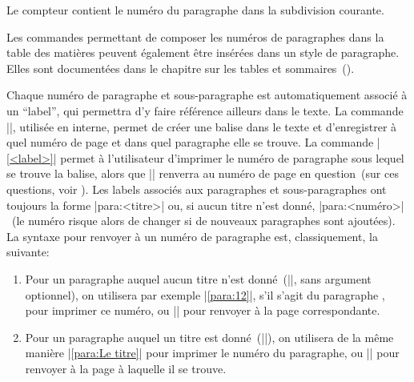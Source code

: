 \begin{developer}
Le compteur  contient le numéro du paragraphe dans la subdivision courante.
\end{developer}

\begin{noprint}
\setcounter{precis}{0}
\end{noprint}

Les commandes permettant de composer les numéros de paragraphes dans la table des matières peuvent également être insérées dans un style de paragraphe. Elles sont documentées dans le chapitre sur les tables et sommaires~(\pageref{tables-of-contents}).

Chaque numéro de paragraphe et sous-paragraphe est automatiquement associé à un \enquote{label}, qui permettra d'y faire référence ailleurs dans le texte. La commande |\label{<label>}|, utilisée en interne, permet de créer une balise dans le texte et d'enregistrer à quel numéro de page et dans quel paragraphe elle se trouve. La commande |\ref{<label>}| permet à l'utilisateur d'imprimer le numéro de paragraphe sous lequel se trouve la balise, alors que |\pageref{<label>}| renverra au numéro de page en question~(sur ces questions, voir ). Les labels associés aux paragraphes et sous-paragraphes ont toujours la forme |para:<titre>| ou, si aucun titre n'est donné, |para:<numéro>|~(le numéro risque alors de changer si de nouveaux paragraphes sont ajoutées). La syntaxe pour renvoyer à un numéro de paragraphe est, classiquement, la suivante:
\begin{enumerate}
\item Pour un paragraphe auquel aucun titre n'est donné~(|\para|, sans argument optionnel), on utilisera par exemple |\ref{para:12}|, s'il s'agit du paragraphe , pour imprimer ce numéro, ou |\pageref{para:12}| pour renvoyer à la page correspondante.
\item Pour un paragraphe auquel un titre est donné~(|\para[Le titre]|), on utilisera de la même manière |\ref{para:Le titre}| pour imprimer le numéro du paragraphe, ou |\pageref{para:Le titre}| pour renvoyer à la page à laquelle il se trouve.
\end{enumerate}

